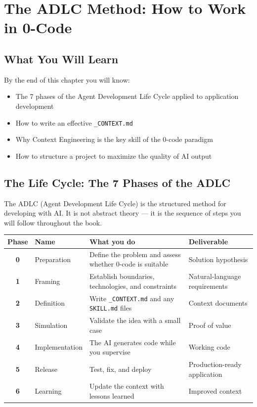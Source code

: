\chapter{The ADLC Method: How to Work in 0-Code}

\section*{What You Will Learn}
By the end of this chapter you will know:
\begin{itemize}
  \item The 7 phases of the Agent Development Life Cycle applied to application development
  \item How to write an effective \texttt{\_CONTEXT.md}
  \item Why Context Engineering is the key skill of the 0-code paradigm
  \item How to structure a project to maximize the quality of AI output
\end{itemize}

\section{The Life Cycle: The 7 Phases of the ADLC}

The ADLC (Agent Development Life Cycle) is the structured method for developing with AI. It is not abstract theory --- it is the sequence of steps you will follow throughout the book.

\begin{center}
\begin{small}
\begin{tabularx}{\textwidth}{c l X X}
\toprule
\textbf{Phase} & \textbf{Name} & \textbf{What you do} & \textbf{Deliverable} \\
\midrule
\textbf{0} & Preparation & Define the problem and assess whether 0-code is suitable & Solution hypothesis \\
\textbf{1} & Framing & Establish boundaries, technologies, and constraints & Natural-language requirements \\
\textbf{2} & Definition & Write \texttt{\_CONTEXT.md} and any \texttt{SKILL.md} files & Context documents \\
\textbf{3} & Simulation & Validate the idea with a small case & Proof of value \\
\textbf{4} & Implementation & The AI generates code while you supervise & Working code \\
\textbf{5} & Release & Test, fix, and deploy & Production-ready application \\
\textbf{6} & Learning & Update the context with lessons learned & Improved context \\
\bottomrule
\end{tabularx}
\end{small}
\end{center}

